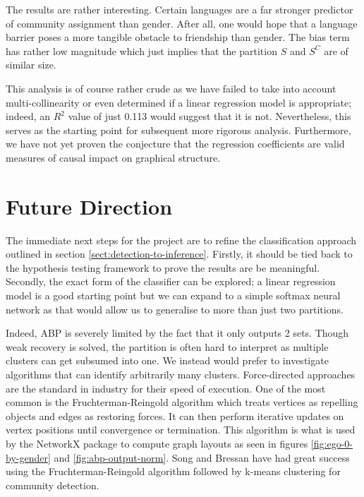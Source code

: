 \documentclass[]{article}
\begin{document}
\begin{multicols*}{2}
The results are rather interesting. Certain languages are a far stronger predictor of community assignment than gender. After all, one would hope that a language barrier poses a more tangible obstacle to friendship than gender. The bias term has rather low magnitude which just implies that the partition $S$ and $S^C$ are of similar size.

This analysis is of course rather crude as we have failed to take into account multi-collinearity or even determined if a linear regression model is appropriate; indeed, an $R^2$ value of just 0.113 would suggest that it is not. Nevertheless, this serves as the starting point for subsequent more rigorous analysis. Furthermore, we have not yet proven the conjecture that the regression coefficients are valid measures of causal impact on graphical structure.

\pagebreak
\section{Future Direction}

The immediate next steps for the project are to refine the classification approach outlined in section \ref{sect:detection-to-inference}. Firstly, it should be tied back to the hypothesis testing framework to prove the results are be meaningful. Secondly, the exact form of the classifier can be explored; a linear regression model is a good starting point but we can expand to a simple softmax neural network as that would allow us to generalise to more than just two partitions.

Indeed, ABP is severely limited by the fact that it only outputs 2 sets. Though weak recovery is solved, the partition is often hard to interpret as multiple clusters can get subsumed into one. We instead would prefer to investigate algorithms that can identify arbitrarily many clusters. Force-directed approaches are the standard in industry for their speed of execution. One of the most common is the Fruchterman-Reingold algorithm which treats vertices as repelling objects and edges as restoring forces. It can then perform iterative updates on vertex positions until convergence or termination. This algorithm is what is used by the NetworkX package \cite{networkx} to compute graph layouts as seen in figures \ref{fig:ego-0-by-gender} and \ref{fig:abp-output-norm}. Song and Bressan \cite{force-directed} have had great success using the Fruchterman-Reingold algorithm followed by k-means clustering for community detection.


\end{multicols*}
\end{document}
